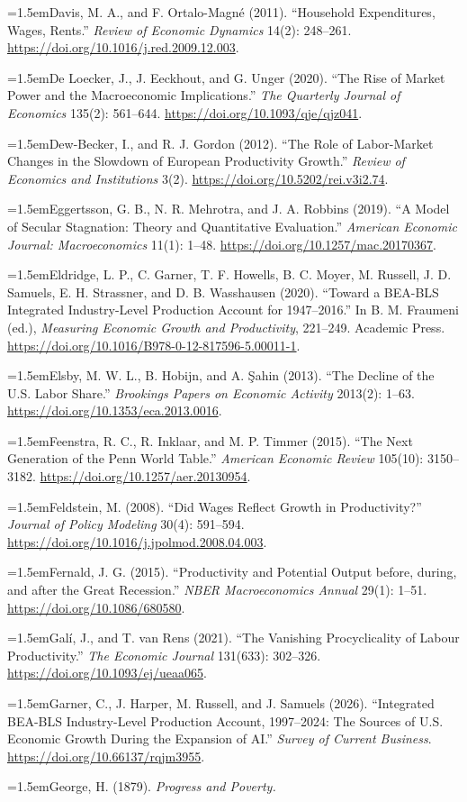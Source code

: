 \documentclass[12pt]{article}
\theoremstyle{plain}
\newcommand{\refentry}[1]{\par\hangindent=1.5em\hangafter=1\noindent #1}
\begin{document}
{\refentry{Davis, M. A., and F. Ortalo-Magn\'e (2011). ``Household Expenditures, Wages, Rents.'' \emph{Review of Economic Dynamics} 14(2): 248--261. \url{https://doi.org/10.1016/j.red.2009.12.003}.}
\refentry{De Loecker, J., J. Eeckhout, and G. Unger (2020). ``The Rise of Market Power and the Macroeconomic Implications.'' \emph{The Quarterly Journal of Economics} 135(2): 561--644. \url{https://doi.org/10.1093/qje/qjz041}.}
\refentry{Dew-Becker, I., and R. J. Gordon (2012). ``The Role of Labor-Market Changes in the Slowdown of European Productivity Growth.'' \emph{Review of Economics and Institutions} 3(2). \url{https://doi.org/10.5202/rei.v3i2.74}.}
\refentry{Eggertsson, G. B., N. R. Mehrotra, and J. A. Robbins (2019). ``A Model of Secular Stagnation: Theory and Quantitative Evaluation.'' \emph{American Economic Journal: Macroeconomics} 11(1): 1--48. \url{https://doi.org/10.1257/mac.20170367}.}
\refentry{Eldridge, L. P., C. Garner, T. F. Howells, B. C. Moyer, M. Russell, J. D. Samuels, E. H. Strassner, and D. B. Wasshausen (2020). ``Toward a BEA-BLS Integrated Industry-Level Production Account for 1947--2016.'' In B. M. Fraumeni (ed.), \emph{Measuring Economic Growth and Productivity}, 221--249. Academic Press. \url{https://doi.org/10.1016/B978-0-12-817596-5.00011-1}.}
\refentry{Elsby, M. W. L., B. Hobijn, and A. \c{S}ahin (2013). ``The Decline of the U.S. Labor Share.'' \emph{Brookings Papers on Economic Activity} 2013(2): 1--63. \url{https://doi.org/10.1353/eca.2013.0016}.}
\refentry{Feenstra, R. C., R. Inklaar, and M. P. Timmer (2015). ``The Next Generation of the Penn World Table.'' \emph{American Economic Review} 105(10): 3150--3182. \url{https://doi.org/10.1257/aer.20130954}.}
\refentry{Feldstein, M. (2008). ``Did Wages Reflect Growth in Productivity?'' \emph{Journal of Policy Modeling} 30(4): 591--594. \url{https://doi.org/10.1016/j.jpolmod.2008.04.003}.}
\refentry{Fernald, J. G. (2015). ``Productivity and Potential Output before, during, and after the Great Recession.'' \emph{NBER Macroeconomics Annual} 29(1): 1--51. \url{https://doi.org/10.1086/680580}.}
\refentry{Gal\'i, J., and T. van Rens (2021). ``The Vanishing Procyclicality of Labour Productivity.'' \emph{The Economic Journal} 131(633): 302--326. \url{https://doi.org/10.1093/ej/ueaa065}.}
\refentry{Garner, C., J. Harper, M. Russell, and J. Samuels (2026). ``Integrated BEA-BLS Industry-Level Production Account, 1997--2024: The Sources of U.S. Economic Growth During the Expansion of AI.'' \emph{Survey of Current Business}. \url{https://doi.org/10.66137/rqjm3955}.}
\refentry{George, H. (1879). \emph{Progress and Poverty.}}
}
\end{document}
